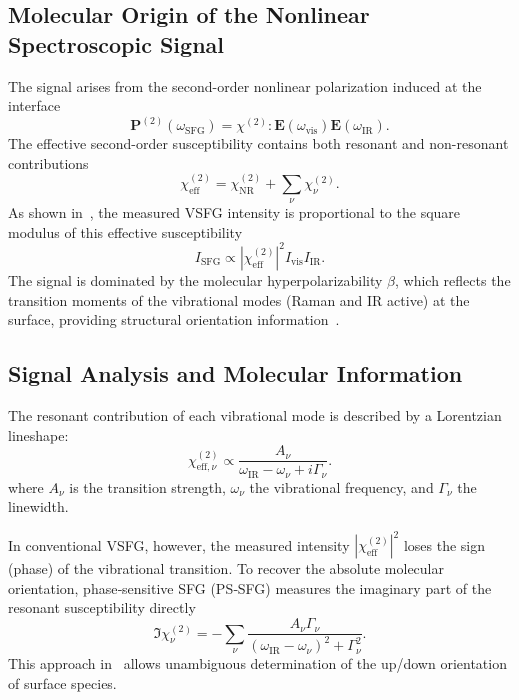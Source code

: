 \subsection{Molecular Origin of the Nonlinear Spectroscopic Signal}

The signal arises from the second-order nonlinear polarization induced at the
interface
\begin{equation}\label{eq:P2}
  \mathbf P^{(2)}(\omega_\text{SFG})
= \chi^{(2)} : \mathbf E(\omega_\text{vis})\mathbf E(\omega_\text{IR}).
\end{equation}
The effective second-order susceptibility contains both resonant and
non-resonant contributions
\begin{equation}\label{eq:chi_sum}
  \chi_{\text{eff}}^{(2)}
= \chi_{\text{NR}}^{(2)} + \sum_{\nu} \chi_{\nu}^{(2)}.
\end{equation}
As shown in~, the measured VSFG intensity is proportional to
the square modulus of this effective susceptibility~\cite{jubb2012environmental}
\begin{equation}\label{eq:I_SFG}
  I_\text{SFG} \propto |\chi_\text{eff}^{(2)}|^2 I_\text{vis} I_\text{IR}.
\end{equation}
The signal is dominated by the molecular hyperpolarizability $\beta$,
which reflects the transition moments of the vibrational modes (Raman and IR
active) at the surface, providing structural orientation
information~\cite{jubb2012environmental}.

\subsection{Signal Analysis and Molecular Information}

The resonant contribution of each vibrational mode is described by a
Lorentzian lineshape:
\begin{equation}\label{eq:lorentzian}
  \chi_{\text{eff}, \nu}^{(2)} \propto
  \frac{A_\nu}{\omega_{\text{IR}} - \omega_\nu + i\Gamma_\nu}.
\end{equation}
where $A_\nu$ is the transition strength, $\omega_\nu$ the vibrational
frequency, and $\Gamma_\nu$ the linewidth.

In conventional VSFG, however, the measured intensity
$|\chi_{\text{eff}}^{(2)}|^2$ loses the sign (phase) of the vibrational
transition. To recover the absolute molecular orientation, phase‑sensitive SFG
(PS‑SFG) measures the imaginary part of the resonant susceptibility
directly~\cite[Eq.~9]{jubb2012environmental}
\begin{equation}\label{eq:imag_chi}
  \Im \chi_\nu^{(2)} = -\sum_\nu
  \frac{A_\nu \Gamma_\nu}{(\omega_{\text{IR}} - \omega_\nu)^2 + \Gamma_\nu^2}.
\end{equation}
This approach in~ allows unambiguous determination of the
up/down orientation of surface species.

